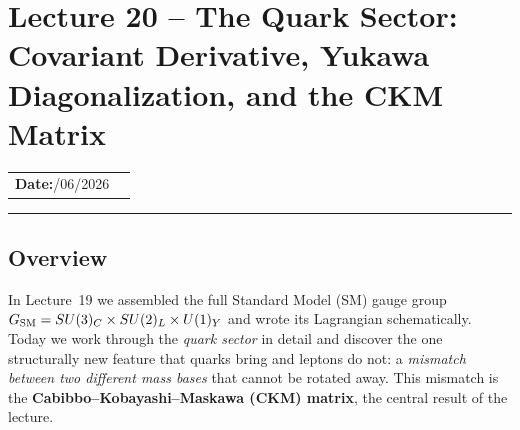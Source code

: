 
\section{Lecture 20 -- The Quark Sector: Covariant Derivative, Yukawa Diagonalization, and the CKM Matrix}\label{sec:lec20}
\begin{center}
\begin{tabular}{ll}
  \textbf{Date:}\quad 21/06/2026 & \\
\end{tabular}
\end{center}
\hrule\vspace{1.5em}

\subsection{Overview}\label{subsec:lec20:overview}

In Lecture~19 we assembled the full Standard Model (SM) gauge group
$G_{\mathrm{SM}} = SU(3)_C\times SU(2)_L\times U(1)_Y$ and wrote its Lagrangian
schematically. Today we work through the \emph{quark sector} in detail
and discover the one structurally new feature that quarks bring and
leptons do not: a \emph{mismatch between two different mass bases} that
cannot be rotated away. This mismatch is the
\textbf{Cabibbo--Kobayashi--Maskawa (CKM) matrix}, the central result of
the lecture.

